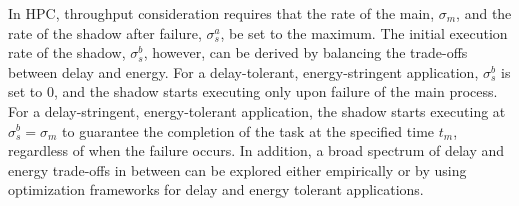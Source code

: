 

In HPC, throughput consideration requires that the rate of the main, $\sigma_m$, and the rate of the shadow after failure, 
$\sigma_s^a$, be set to the maximum. 
The initial execution rate of the shadow, $\sigma_s^b$, however, can be derived by balancing the trade-offs between delay and energy.
For a delay-tolerant, energy-stringent application, $\sigma_s^b$ is set to 0, and the shadow starts executing only upon failure of the main process. %
For a delay-stringent, energy-tolerant application, the shadow starts executing at $\sigma_s^b=\sigma_m$ to guarantee the completion of the task at the specified time $t_m$, regardless of when the failure occurs. %
In addition, a broad spectrum of delay and energy trade-offs in between can be explored either empirically or by using optimization frameworks for delay and energy tolerant applications.










